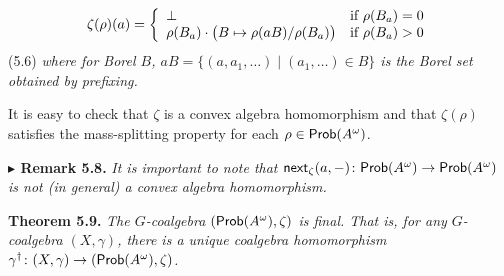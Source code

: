 \hypertarget{html:S5.E6}{}   %
\hypertarget{html:S5.E6.m1}{}\[\zeta(\rho)(a)=\left\{\begin{array}[]{ll}\bot&\mbox{if $\rho(B_{a})=0$}\\
\rho(B_{a})\cdot\big{(}B\mapsto\rho(aB)/\rho(B_{a})\big{)}&\mbox{if $\rho(B_{a})>0$}\end{array}\right.\]  (5.6)   \emph{where for Borel %
\hypertarget{html:S5.Thmtheorem7.p1.m4}{}\({B}\), %
\hypertarget{html:S5.Thmtheorem7.p1.m5}{}\({aB=\{(a,a_{1},\dots)\mid(a_{1},\dots)\in B\}}\) is the Borel set obtained by prefixing.}
\par\medskip
\hypertarget{html:S5.SS0.SSS0.Px1.SPx1.p2}{} It is easy to check that %
\hypertarget{html:S5.SS0.SSS0.Px1.SPx1.p2.m1}{}\({\zeta}\) is a convex algebra homomorphism and that %
\hypertarget{html:S5.SS0.SSS0.Px1.SPx1.p2.m2}{}\({\zeta(\rho)}\) satisfies the mass-splitting property for each %
\hypertarget{html:S5.SS0.SSS0.Px1.SPx1.p2.m3}{}\({\rho\in\text{\sf Prob}(A^{\omega})}\).
\par\medskip
\hypertarget{html:S5.Thmtheorem8}{} \par\noindent\textbf{%
\hypertarget{html:S5.Thmtheorem8.m1}{}\({\blacktriangleright}\) Remark 5.8.}\quad  %
\hypertarget{html:S5.Thmtheorem8.p1}{} \emph{It is important to note that %
\hypertarget{html:S5.Thmtheorem8.p1.m1}{}\({\mbox{\sf next}_{\zeta}(a,-)\colon\text{\sf Prob}(A^{\omega})\to\text{\sf Prob}(A^{\omega})}\) is \emph{not} (in general) a convex algebra homomorphism.}
\par\medskip
\hypertarget{html:S5.Thmtheorem9}{} \par\noindent\textbf{\textbf{Theorem 5.9}\textbf{.}}\quad  %
\hypertarget{html:S5.Thmtheorem9.p1}{} \emph{The %
\hypertarget{html:S5.Thmtheorem9.p1.m1}{}\({G}\)-coalgebra %
\hypertarget{html:S5.Thmtheorem9.p1.m2}{}\({(\text{\sf Prob}(A^{\omega}),\zeta)}\) is final. That is, for any %
\hypertarget{html:S5.Thmtheorem9.p1.m3}{}\({G}\)-coalgebra %
\hypertarget{html:S5.Thmtheorem9.p1.m4}{}\({(X,\gamma)}\), there is a unique coalgebra homomorphism %
\hypertarget{html:S5.Thmtheorem9.p1.m5}{}\({\gamma^{{\dagger}}\colon(X,\gamma)\to(\text{\sf Prob}(A^{\omega}),\zeta)}\).}
